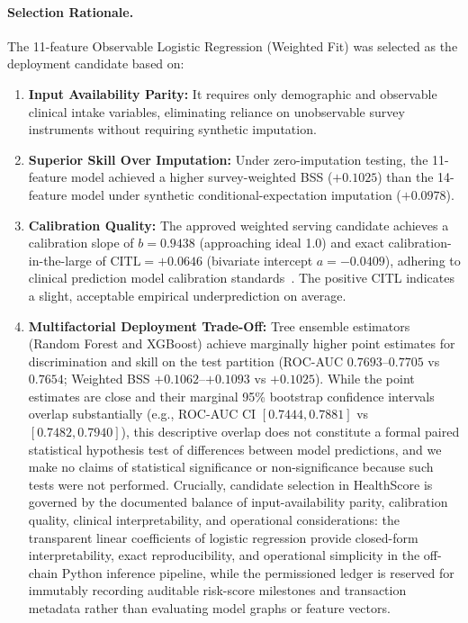 \documentclass[runningheads]{llncs}
\begin{document}
\paragraph{Selection Rationale.}
The 11-feature Observable Logistic Regression (Weighted Fit) was selected as the deployment candidate based on:
\begin{enumerate}
    \item \textbf{Input Availability Parity:} It requires only demographic and observable clinical intake variables, eliminating reliance on unobservable survey instruments without requiring synthetic imputation.
    \item \textbf{Superior Skill Over Imputation:} Under zero-imputation testing, the 11-feature model achieved a higher survey-weighted BSS ($+0.1025$) than the 14-feature model under synthetic conditional-expectation imputation ($+0.0978$).
    \item \textbf{Calibration Quality:} The approved weighted serving candidate achieves a calibration slope of $b = 0.9438$ (approaching ideal 1.0) and exact calibration-in-the-large of $\text{CITL} = +0.0646$ (bivariate intercept $a = -0.0409$), adhering to clinical prediction model calibration standards~\cite{steyerberg2010assessing}. The positive CITL indicates a slight, acceptable empirical underprediction on average.
    \item \textbf{Multifactorial Deployment Trade-Off:} Tree ensemble estimators (Random Forest and XGBoost) achieve marginally higher point estimates for discrimination and skill on the test partition (ROC-AUC $0.7693$--$0.7705$ vs $0.7654$; Weighted BSS $+0.1062$--$+0.1093$ vs $+0.1025$). While the point estimates are close and their marginal 95\% bootstrap confidence intervals overlap substantially (e.g., ROC-AUC CI $[0.7444, 0.7881]$ vs $[0.7482, 0.7940]$), this descriptive overlap does not constitute a formal paired statistical hypothesis test of differences between model predictions, and we make no claims of statistical significance or non-significance because such tests were not performed. Crucially, candidate selection in HealthScore is governed by the documented balance of input-availability parity, calibration quality, clinical interpretability, and operational considerations: the transparent linear coefficients of logistic regression provide closed-form interpretability, exact reproducibility, and operational simplicity in the off-chain Python inference pipeline, while the permissioned ledger is reserved for immutably recording auditable risk-score milestones and transaction metadata rather than evaluating model graphs or feature vectors.
\end{enumerate}
\end{document}

